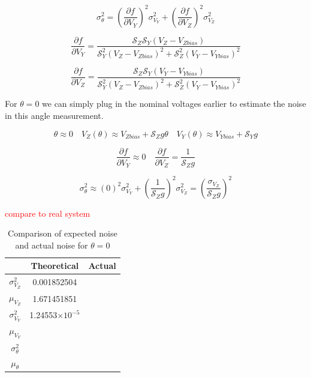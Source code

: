 \documentclass{article}
\newcommand{\xxx}[1]{\textcolor{red}{#1}}
\theoremstyle{plain}
\theoremstyle{definition}
\theoremstyle{remark}
\newcommand{\Sens}{\mathcal{S}}
\providecommand{\e}[1]{\ensuremath{\times 10^{#1}}}
\begin{document}
$$ \sigma^2_{\theta} = \left(\frac{\partial f}{\partial V_{Y}}\right)^2 \sigma^2_{V_{Y}} + \left(\frac{\partial f }{\partial V_Z} \right)^2 \sigma^2_{V_{Z}} $$

$$ \frac{\partial f}{\partial V_{Y}} = \frac{\Sens_Z \Sens_Y \left(V_{Z} - V_{Zbias} \right)}{\Sens^2_Y \left(V_Z - V_{Zbias} \right) ^2 + \Sens^2_Z \left( V_Y - V_{Ybias}\right)^2}$$

$$ \frac{\partial f }{\partial V_Z} = \frac{\Sens_Z \Sens_Y \left(V_{Y} - V_{Ybias} \right)}{\Sens^2_Y \left(V_Z - V_{Zbias} \right) ^2 + \Sens^2_Z \left( V_Y - V_{Ybias}\right)^2}$$

For $\theta = 0$ we can simply plug in the nominal voltages earlier to estimate the noise in this angle measurement.

$$ \theta \approx 0 \quad V_{Z}(\theta) \approx V_{Zbias} + \Sens_{Z} g \theta \quad V_{Y}(\theta)  \approx V_{Ybias} + \Sens_{Y} g $$

$$ \frac{\partial f}{\partial V_{Y}} \approx 0  \quad \frac{\partial f }{\partial V_Z} = \frac{1}{\Sens_{Z} g}$$

$$ \sigma^2_{\theta} \approx \left(0\right)^2 \sigma^2_{V_{Y}} + \left(\frac{1}{\Sens_{Z} g} \right)^2 \sigma^2_{V_{Z}} = \left( \frac{\sigma_{V_Z}}{\Sens_{Z} g} \right)^2$$

\xxx{compare to real system}


\begin{table}
\begin{center}
    \begin{tabular}{|c|c|c|}
        \hline
        ~                   & Theoretical  & Actual \\ \hline
        $\sigma^2_{V_{Z}}$    & 0.001852504            & ~      \\ 
	$\mu_{V_{Z}}$       & 1.671451851            & ~      \\ 
	$\sigma^2_{V_{Y}}$ & 1.24553\e{-5}		& ~ \\
	$\mu_{V_{Y}}$       & ~            & ~      \\ 
        $\sigma^2_{\theta}$ & ~            & ~      \\ 
        $\mu_{\theta}$      & ~            & ~      \\
        \hline
    \end{tabular}
\label{Noise_dual_T}
\caption{Comparison of expected noise and actual noise for $\theta = 0$}
\end{center}
\end{table}
\end{document}
